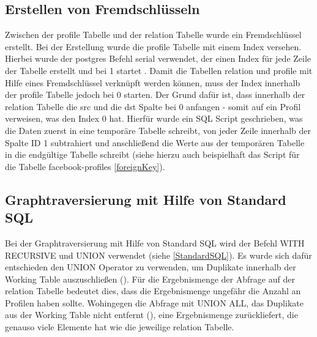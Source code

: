 \subsection{Erstellen von Fremdschlüsseln}
Zwischen der profile Tabelle und der relation Tabelle wurde ein Fremdschlüssel erstellt. Bei der Erstellung wurde die profile Tabelle
mit einem Index versehen. Hierbei wurde der postgres Befehl serial verwendet, der einen Index für jede Zeile der Tabelle erstellt und bei 1 startet . Damit die Tabellen
relation und profile mit Hilfe eines Fremdschlüssel verknüpft werden können, muss der Index innerhalb der profile Tabelle jedoch bei 0 starten. Der Grund dafür ist, dass
innerhalb der relation Tabelle die src und die dst Spalte bei 0 anfangen - somit auf ein Profil verweisen, was den Index 0 hat. Hierfür wurde ein SQL Script geschrieben,
was die Daten zuerst in eine temporäre Tabelle schreibt, von jeder Zeile innerhalb der Spalte ID 1 subtrahiert und anschließend die Werte aus der temporären Tabelle
in die endgültige Tabelle schreibt (siehe hierzu auch beispielhaft das Script für die Tabelle facebook-profiles \ref{foreignKey}).


\subsection{Graphtraversierung mit Hilfe von Standard \ac{SQL}}
Bei der Graphtraversierung mit Hilfe von Standard \ac{SQL} wird der Befehl WITH RECURSIVE und UNION verwendet (siehe \ref{StandardSQL}). Es wurde sich dafür entschieden den
UNION Operator zu verwenden, um Duplikate innerhalb der Working Table auszuschließen (\cite{postgresWithRecursive}). Für die Ergebnismenge der Abfrage auf der relation
Tabelle bedeutet dies, dass die Ergebnismenge ungefähr die Anzahl an Profilen haben sollte. Wohingegen die Abfrage mit UNION ALL, das Duplikate aus der Working Table
nicht entfernt (\cite{postgresWithRecursive}), eine Ergebnismenge zurückliefert, die genauso viele Elemente hat wie die jeweilige relation Tabelle.

